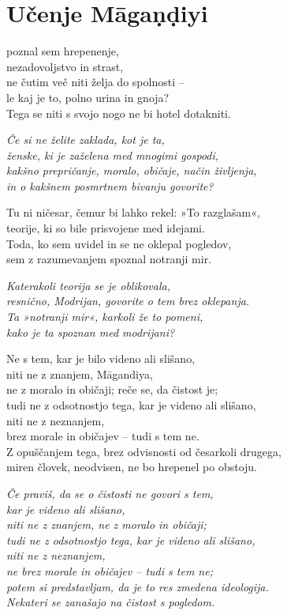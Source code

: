 \cleartorecto
{}
\chapter{Učenje Māgaṇḍiyi}

poznal sem hrepenenje,\\
nezadovoljstvo in strast,\\
ne čutim več niti želja do spolnosti --\\
le kaj je to, polno urina in gnoja?\\
Tega se niti s svojo nogo ne bi hotel dotakniti.

\emph{Če si ne želite zaklada, kot je ta,\\
ženske, ki je zaželena med mnogimi gospodi,\\
kakšno prepričanje, moralo, običaje, način življenja,\\
in o kakšnem posmrtnem bivanju govorite?}

\clearpage

Tu ni ničesar, čemur bi lahko rekel: »To razglašam«,\\
teorije, ki so bile prisvojene med idejami.\\
Toda, ko sem uvidel in se ne oklepal pogledov,\\
sem z razumevanjem spoznal notranji mir.

\emph{Katerakoli teorija se je oblikovala,\\
resnično, Modrijan, govorite o tem brez oklepanja.\\
Ta »notranji mir«, karkoli že to pomeni,\\
kako je ta spoznan med modrijani?}

Ne s tem, kar je bilo videno ali slišano,\\\vin niti ne z znanjem, Māgandiya,\\
ne z moralo in običaji; reče se, da čistost je;\\
tudi ne z odsotnostjo tega, kar je videno ali slišano,\\\vin niti ne z neznanjem,\\
brez morale in običajev -- tudi s tem ne.\\
Z opuščanjem tega, brez odvisnosti od česarkoli drugega,\\
miren človek, neodvisen, ne bo hrepenel po obstoju.

\clearpage

\emph{Če praviš, da se o čistosti ne govori s tem,\\\vin kar je videno ali slišano,\\
niti ne z znanjem, ne z moralo in običaji;\\
tudi ne z odsotnostjo tega, kar je videno ali slišano,\\\vin niti ne z neznanjem,\\
ne brez morale in običajev -- tudi s tem ne;\\
potem si predstavljam, da je to res zmedena ideologija.\\
Nekateri se zanašajo na čistost s pogledom.}

